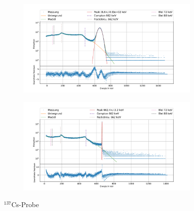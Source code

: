 \documentclass[
	a4paper,
	12pt,
	pagesize,
	ngerman
]{scrartcl}
\begin{document}
\begin{figure}[H]
		\centering
		\begin{subfigure}[c]{\textwidth}
			\centering
			\includegraphics[width= 1 \linewidth]{img/CsNa.pdf}
		\end{subfigure}
		\begin{subfigure}[c]{\textwidth}
			\centering
			\includegraphics[width= 1 \linewidth]{img/CsGe.pdf}
		\end{subfigure}
		\caption{$^{137}$Cs-Probe}
		\label{fg_Cs}
	\end{figure}
\end{document}
